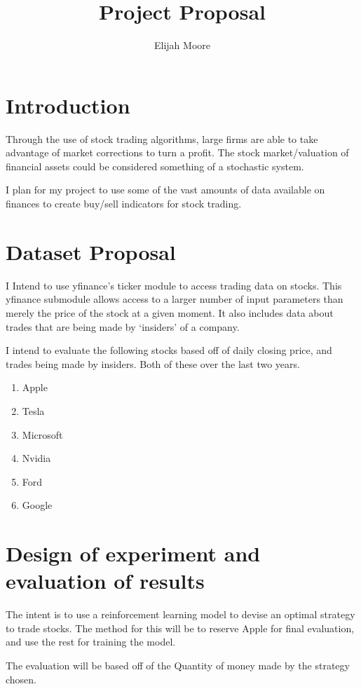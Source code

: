 \documentclass{article}
\title{Project Proposal}
\author{Elijah Moore}
\begin{document}
\maketitle
\section{Introduction}

   Through the use of stock trading algorithms, large firms are able to take advantage of market corrections
   to turn a profit. The stock market/valuation of financial assets could be considered something of a stochastic system.
   
   I plan for my project to use some of the vast amounts of data available on finances to
   create buy/sell indicators for stock trading.

\section{Dataset Proposal}
    I Intend to use yfinance's ticker module to access trading data on stocks.
    This yfinance submodule allows access to a larger number of input parameters than merely the price of the stock at a given moment.
    It also includes data about trades that are being made by `insiders' of a company.

    I intend to evaluate the following stocks based off of daily closing price, and trades being made by insiders.
    Both of these over the last two years.
    \begin{enumerate}
        \item Apple
        \item Tesla
        \item Microsoft
        \item Nvidia
        \item Ford
        \item Google
    \end{enumerate}
\section{Design of experiment and evaluation of results}

    The intent is to use a reinforcement learning model to devise an optimal strategy to trade stocks.
    The method for this will be to reserve Apple for final evaluation, and use the rest for training the model.
    
    The evaluation will be based off of the Quantity of money made by the strategy chosen.


    

    
\end{document}
